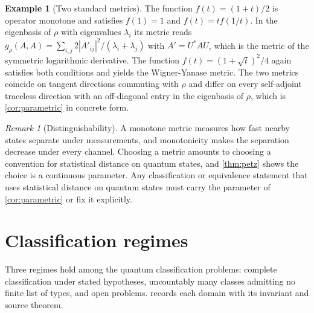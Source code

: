 \documentclass[11pt,letterpaper]{article}
\theoremstyle{definition}
\newtheorem{example}[theorem]{Example}
\theoremstyle{remark}
\newtheorem{remark}[theorem]{Remark}
\begin{document}
\begin{example}[Two standard metrics]
\label{ex:metrics}
The function $f(t) = (1 + t)/2$ is operator monotone and satisfies $f(1) = 1$ and $f(t) = t f(1/t)$. In the eigenbasis of $\rho$ with eigenvalues $\lambda_i$ its metric reads $g_\rho(A, A) = \sum_{i,j} 2 |A'_{ij}|^2 / (\lambda_i + \lambda_j)$ with $A' = U^* A U$, which is the metric of the symmetric logarithmic derivative. The function $f(t) = (1 + \sqrt{t})^2 / 4$ again satisfies both conditions and yields the Wigner-Yanase metric. The two metrics coincide on tangent directions commuting with $\rho$ and differ on every self-adjoint traceless direction with an off-diagonal entry in the eigenbasis of $\rho$, which is \cref{cor:parametric} in concrete form.
\end{example}

\begin{remark}[Distinguishability]
\label{rem:distinguish}
A monotone metric measures how fast nearby states separate under measurements, and monotonicity makes the separation decrease under every channel. Choosing a metric amounts to choosing a convention for statistical distance on quantum states, and \cref{thm:petz} shows the choice is a continuous parameter. Any classification or equivalence statement that uses statistical distance on quantum states must carry the parameter of \cref{cor:parametric} or fix it explicitly.
\end{remark}

\section{Classification regimes}
\label{sec:regimes}

Three regimes hold among the quantum classification problems: complete classification under stated hypotheses, uncountably many classes admitting no finite list of types, and open problems.  records each domain with its invariant and source theorem.
\end{document}
